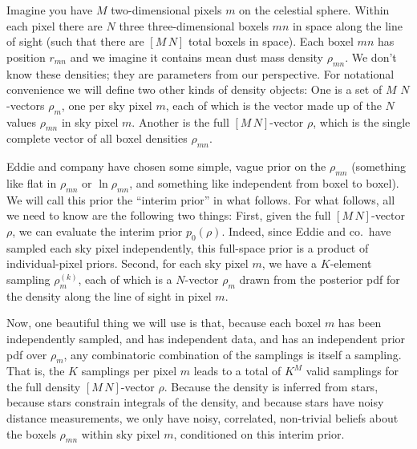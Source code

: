 \documentclass[12pt, letterpaper]{article}
\begin{document}
Imagine you have $M$ two-dimensional pixels $m$ on the celestial sphere.
Within each pixel there are $N$ three three-dimensional boxels $mn$ in space along the line of sight
  (such that there are $[M\,N]$ total boxels in space).
Each boxel $mn$ has position $r_{mn}$ and we imagine it contains mean dust mass density $\rho_{mn}$.
We don't know these densities;
  they are parameters from our perspective.
For notational convenience we will define two other kinds of density objects:
One is a set of $M$ $N$-vectors $\rho_m$, one per sky pixel $m$,
  each of which is the vector made up of the $N$ values $\rho_{mn}$ in sky pixel $m$.
Another is the full $[M\,N]$-vector $\rho$,
  which is the single complete vector of all boxel densities $\rho_{mn}$.

Eddie and company have chosen some simple, vague prior on the $\rho_{mn}$
  (something like flat in $\rho_{mn}$ or $\ln\rho_{mn}$, and something like independent from boxel to boxel).
We will call this prior the ``interim prior'' in what follows.
For what follows, all we need to know are the following two things:
First, given the full $[M\,N]$-vector $\rho$,
  we can evaluate the interim prior $p_0(\rho)$.
Indeed, since Eddie and co.\ have sampled each sky pixel independently,
  this full-space prior is a product of individual-pixel priors.
Second, for each sky pixel $m$, we have a $K$-element sampling $\rho_{m}^{(k)}$,
  each of which is a $N$-vector $\rho_m$ drawn from the posterior pdf
  for the density along the line of sight in pixel $m$.

Now, one beautiful thing we will use is that,
  because each boxel $m$ has been independently sampled,
  and has independent data,
  and has an independent prior pdf over $\rho_m$,
  any combinatoric combination of the samplings is itself a sampling.
That is, the $K$ samplings per pixel $m$
  leads to a total of $K^M$ valid samplings for the full density $[M\,N]$-vector $\rho$.
Because the density is inferred from stars,
  because stars constrain integrals of the density,
  and because stars have noisy distance measurements,
  we only have noisy, correlated, non-trivial beliefs about the boxels $\rho_{mn}$ within sky pixel $m$,
  conditioned on this interim prior.
\end{document}
